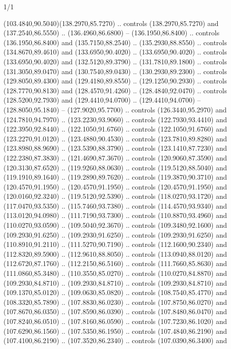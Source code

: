 \begin{flagdescription}{1/1}
\begin{scope}[xshift=0.75\flaglength]
\begin{scope}[scale=0.00209\flagwidth,yshift=134.4mm,xshift=-29.7mm]
\begin{scope}[y=0.80pt, x=0.80pt, yscale=-1, xscale=1, inner sep=0pt, outer sep=0pt,line width=0.0015\flagwidth]
  (103.4840,90.5040)(138.2970,85.7270) .. controls (138.2970,85.7270) and
  (137.2540,86.5550) .. (136.4960,86.6800) -- (136.1950,86.8400) .. controls
  (136.1950,86.8400) and (135.7150,88.2540) .. (135.2930,88.8550) .. controls
  (134.8670,89.4610) and (133.6950,90.4020) .. (133.6950,90.4020) .. controls
  (133.6950,90.4020) and (132.5120,89.3790) .. (131.7810,89.1800) .. controls
  (131.3050,89.0470) and (130.7540,89.0430) .. (130.2930,89.2300) .. controls
  (129.8050,89.4300) and (129.4180,89.8550) .. (129.1250,90.2930) .. controls
  (128.7770,90.8130) and (128.4570,91.4260) .. (128.4840,92.0470) .. controls
  (128.5200,92.7930) and (129.4410,94.0700) .. (129.4410,94.0700) --
  (128.8050,95.1840) -- (127.9020,95.7700) .. controls (126.3440,95.2970) and
  (124.7810,94.7970) .. (123.2230,93.9060) .. controls (122.7930,93.4410) and
  (122.3950,92.8440) .. (122.1050,91.6760) .. controls (122.1050,91.6760) and
  (123.2270,91.0120) .. (123.4880,90.4530) .. controls (123.7810,89.8280) and
  (123.8980,88.9690) .. (123.5390,88.3790) .. controls (123.1410,87.7230) and
  (122.2380,87.3830) .. (121.4690,87.3670) .. controls (120.9060,87.3590) and
  (120.3130,87.6520) .. (119.9260,88.0630) .. controls (119.5120,88.5040) and
  (119.1910,89.1640) .. (119.2890,89.7620) .. controls (119.3870,90.3710) and
  (120.4570,91.1950) .. (120.4570,91.1950) .. controls (120.4570,91.1950) and
  (120.0160,92.3240) .. (119.5120,92.5390) .. controls (118.0270,93.1720) and
  (117.0470,93.5350) .. (115.7460,93.7380) .. controls (114.4570,93.9340) and
  (113.0120,94.0980) .. (111.7190,93.7300) .. controls (110.8870,93.4960) and
  (110.0270,93.0590) .. (109.5040,92.3670) .. controls (109.3480,92.1600) and
  (109.2930,91.6250) .. (109.2930,91.6250) .. controls (109.2930,91.6250) and
  (110.8910,91.2110) .. (111.5270,90.7190) .. controls (112.1600,90.2340) and
  (112.8320,89.5900) .. (112.9610,88.8050) .. controls (113.0940,88.0120) and
  (112.6720,87.1760) .. (112.2150,86.5160) .. controls (111.7660,85.8630) and
  (111.0860,85.3480) .. (110.3550,85.0270) .. controls (110.0270,84.8870) and
  (109.2930,84.8710) .. (109.2930,84.8710) .. controls (109.2930,84.8710) and
  (109.1370,85.0120) .. (109.0630,85.0820) .. controls (108.7540,85.4770) and
  (108.3320,85.7890) .. (107.8830,86.0230) .. controls (107.8750,86.0270) and
  (107.8670,86.0350) .. (107.8590,86.0390) .. controls (107.8480,86.0470) and
  (107.8240,86.0510) .. (107.8160,86.0590) .. controls (107.7230,86.1020) and
  (107.6290,86.1560) .. (107.5350,86.1950) .. controls (107.4840,86.2190) and
  (107.4100,86.2190) .. (107.3520,86.2340) .. controls (107.0390,86.3400) and

\end{scope}
\end{scope}
\end{scope}
\end{flagdescription}
